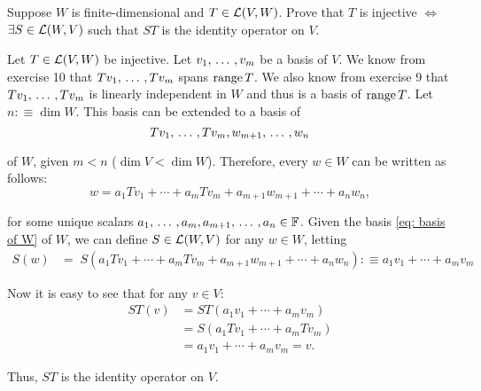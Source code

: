 \begin{xrcs}
  Suppose $W$ is finite-dimensional and $T\in \mathcal{L}(V,W)$. Prove that $T$ is injective $\iff$ $\exists S \in \mathcal{L}(W,V)$ such that $ST$ is the identity operator on $V$.

  \begin{xprf}
    \Rightarrowdirection Let $T \in \mathcal{L} (V,W)$ be injective. Let $v_1, {\, \ldots \,\,}, v_m$ be a basis of $V$. We know from exercise 10 that $T v_1, {\, \ldots \,\,}, Tv_m$ spans $\operatorname{range} T$. We also know from exercise 9 that $T v_1, {\, \ldots \,\,}, Tv_m$ is linearly independent in $W$ and thus is a basis of $\operatorname{range} T$. Let $n :\equiv \dim W$. This basis can be extended to a basis of
    \begin{equation}
      \label{eq: basis of W}
      T v_1, {\, \ldots \,\,}, Tv_m, w_{m+1}, {\, \ldots \,\,}, w_n
    \end{equation}

    of $W$, given $m < n$ ($\dim V < \dim W$). Therefore, every $w \in W$ can be written as follows:
    \begin{equation}
      w = a_1 T v_1 + \cdots + a_m T v_m + a_{m+1} w_{m+1} + \cdots + a_{n} w_n,
    \end{equation}

    for some unique scalars $a_1, {\, \ldots \,\,}, a_m, a_{m+1}, {\, \ldots \,\,}, a_n \in \mathbb{F}$. Given the basis \eqref{eq: basis of W} of $W$, we can define $S \in \mathcal{L} (W,V)$ for any $w \in W$, letting
    \begin{equation}
      \begin{aligned}
        S(w) &= \;  S(a_1 T v_1 + \cdots + a_m T v_m + a_{m+1} w_{m+1} + \cdots + a_{n} w_n)
        :\equiv a_1 v_1 + \cdots + a_m v_m
      \end{aligned}
    \end{equation}

    Now it is easy to see that for any $v \in V$:
    \begin{equation}
      \begin{aligned}
        ST(v) &= ST(a_1 v_1 + \cdots + a_m v_m) \\
        &= S(a_1 T v_1 + \cdots + a_m T v_m) \\
        &= a_1 v_1 + \cdots + a_m v_m = v.
      \end{aligned}
    \end{equation}

    Thus, $ST$ is the identity operator on $V$.


\end{xprf}
\end{xrcs}
